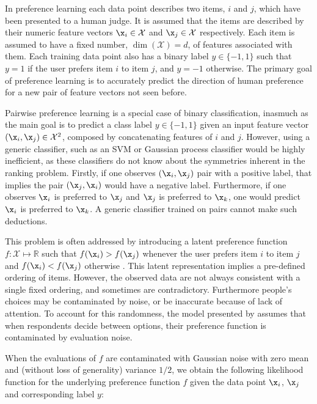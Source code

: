 In preference learning each data point describes two items, $i$ and $j$, which have been presented to a human judge. It is assumed that the items are described by their numeric feature vectors $\x_i\in\mathcal{X}$ and $\x_j\in\mathcal{X}$ respectively. Each item is assumed to have a fixed number, $\dim(\mathcal{X})=d$, of features associated with them. Each training data point also has a binary label $y\in\{-1,1\}$ such that $y=1$ if the user prefers item $i$ to item $j$, and $y=-1$ otherwise. The primary goal of preference learning is to accurately predict the direction of human preference for a new pair of feature vectors not seen before.

Pairwise preference learning is a special case of binary classification, inasmuch as the main goal is to predict a class label $y\in\{-1,1\}$ given an input feature vector $(\x_i,\x_j)\in\mathcal{X}^2$, composed by concatenating features of $i$ and $j$. However, using a generic classifier, such as an SVM or Gaussian process classifier would be highly inefficient, as these classifiers do not know about the symmetries inherent in the ranking problem. Firstly, if one observes $(\x_i,\x_j)$ pair with a positive label, that implies the pair $(\x_j,\x_i)$ would have a negative label. Furthermore, if one observes $\x_i$ is preferred to $\x_j$ and $\x_j$ is preferred to $\x_k$, one would predict $\x_i$ is preferred to $\x_k$. A generic classifier trained on pairs cannot make such deductions.

This problem is often addressed by introducing a latent preference function $f:\mathcal{X}\mapsto \mathbb{R}$ such that
$f(\x_i) > f(\x_j)$ whenever the user prefers item $i$ to item $j$ and $f(\x_i) < f(\x_j)$ otherwise \citep{Chu2005}. This latent representation implies a pre-defined ordering of items. However, the observed data are not always consistent with a single fixed ordering, and sometimes are contradictory. Furthermore people's choices may be contaminated by noise, or be inaccurate because of lack of attention. To account for this randomness, the model presented by \citep{Chu2005} assumes that when respondents decide between options, their preference function is contaminated by evaluation noise.

When the evaluations of $f$ are contaminated with Gaussian noise with zero mean and (without loss of generality) variance $1/2$, we obtain the following likelihood function for the underlying preference function $f$ given the data point $\x_i$, $\x_j$ and corresponding label $y$:

